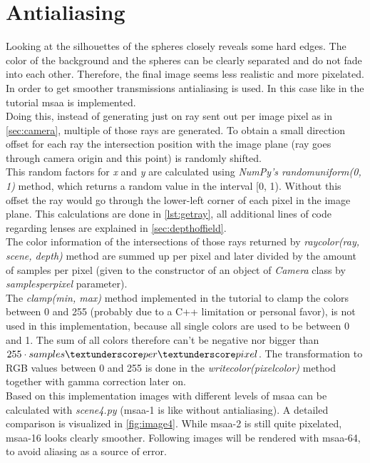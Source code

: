 \documentclass[]{article}
\begin{document}
	\section{Antialiasing}
	\label{sec:antialiasing}
	Looking at the silhouettes of the spheres closely reveals some hard edges. The color of the background and the spheres can be clearly separated and do not fade into each other. Therefore, the final image seems less realistic and more pixelated. In order to get smoother transmissions antialiasing is used. In this case like in the tutorial \ac{msaa} is implemented.
	\\
	Doing this, instead of generating just on ray sent out per image pixel as in \cref{sec:camera}, multiple of those rays are generated. To obtain a small direction offset for each ray the intersection position with the image plane (ray goes through camera origin and this point) is randomly shifted.
	\\
	This random factors for \emph{x} and \emph{y} are calculated using \emph{NumPy’s random\textunderscore uniform(0, 1)} method, which returns a random value in the interval [0, 1). Without this offset the ray would go through the lower-left corner of each pixel in the image plane. This calculations are done in \cref{lst:getray}, all additional lines of code regarding lenses are explained in \cref{sec:depthoffield}.
	\\
	The color information of the intersections of those rays returned by \emph{ray\textunderscore color(ray, scene, depth)} method are summed up per pixel and later divided by the amount of samples per pixel (given to the constructor of an object of \emph{Camera} class by \emph{samples\textunderscore per\textunderscore pixel} parameter). 
	\\
	The \emph{clamp(min, max)} method implemented in the tutorial to clamp the colors between 0 and 255 (probably due to a C++ limitation or personal favor), is not used in this implementation, because all single colors are used to be between 0 and 1. The sum of all colors therefore can’t be negative nor bigger than $255\cdot  samples\textunderscore per\textunderscore pixel$. The transformation to RGB values between 0 and 255 is done in the \emph{write\textunderscore color(pixel\textunderscore color)} method together with gamma correction later on.
	\\
	Based on this implementation images with different levels of \ac{msaa} can be calculated with \emph{scene4.py} (\ac{msaa}-1 is like without antialiasing). A detailed comparison is visualized in \cref{fig:image4}. While \ac{msaa}-2 is still quite pixelated, \ac{msaa}-16 looks clearly smoother. Following images will be rendered with \ac{msaa}-64, to avoid aliasing as a source of error.
	
\end{document}
